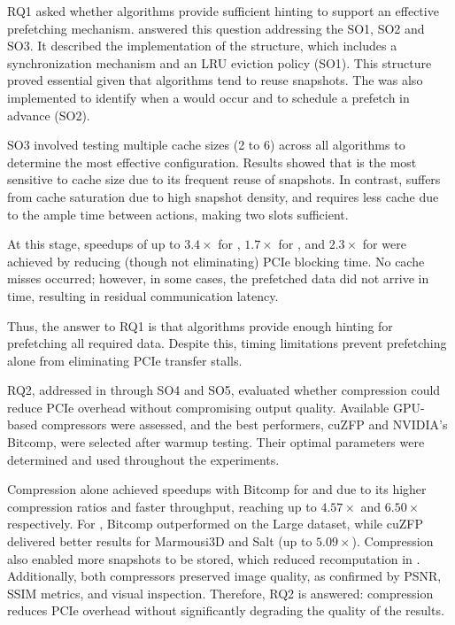 \documentclass[Ingles]{ic-tese-v3}
\begin{document}
RQ1 asked whether \checkpointing algorithms provide sufficient hinting to support an effective prefetching mechanism.  answered this question addressing the SO1, SO2 and SO3. It described the implementation of the \cache structure, which includes a synchronization mechanism and an LRU eviction policy (SO1). This structure proved essential given that \checkpointing algorithms tend to reuse snapshots. The \psa was also implemented to identify when a  would occur and to schedule a prefetch in advance (SO2).

SO3 involved testing multiple cache sizes (2 to 6) across all \checkpointing algorithms to determine the most effective configuration. Results showed that \revolve is the most sensitive to cache size due to its frequent reuse of snapshots. In contrast, \zcut suffers from cache saturation due to high snapshot density, and \uniform requires less cache due to the ample time between \restore actions, making two slots sufficient.

At this stage, speedups of up to $3.4\times$ for \revolve, $1.7\times$ for \zcut, and $2.3\times$ for \uniform were achieved by reducing (though not eliminating) PCIe blocking time. No cache misses occurred; however, in some cases, the prefetched data did not arrive in time, resulting in residual communication latency.

Thus, the answer to RQ1 is that \checkpointing algorithms provide enough hinting for prefetching all required data. Despite this, timing limitations prevent prefetching alone from eliminating PCIe transfer stalls.

RQ2, addressed in  through SO4 and SO5, evaluated whether compression could reduce PCIe overhead without compromising output quality. Available GPU-based compressors were assessed, and the best performers, cuZFP and NVIDIA's Bitcomp, were selected after warmup testing. Their optimal parameters were determined and used throughout the experiments.

Compression alone achieved speedups with Bitcomp for \revolve and \zcut due to its higher compression ratios and faster throughput, reaching up to $4.57\times$ and $6.50\times$ respectively. For \uniform, Bitcomp outperformed on the Large dataset, while cuZFP delivered better results for Marmousi3D and Salt (up to $5.09\times$). Compression also enabled more snapshots to be stored, which reduced recomputation in \uniform. Additionally, both compressors preserved image quality, as confirmed by PSNR, SSIM metrics, and visual inspection. Therefore, RQ2 is answered: compression reduces PCIe overhead without significantly degrading the quality of the results.
\end{document}

